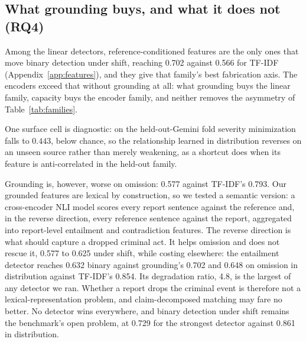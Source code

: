 \documentclass{article}
\begin{document}
\subsection{What grounding buys, and what it does not (RQ4)}
\label{sec:grounding}

Among the linear detectors, reference-conditioned features are the only ones
that move binary detection under shift, reaching 0.702 against 0.566 for TF-IDF
(Appendix~\ref{app:features}), and they give that family's best fabrication axis.
The encoders exceed that without grounding at all: what grounding buys
the linear family, capacity buys the encoder family, and neither removes the
asymmetry of Table~\ref{tab:families}.

One surface cell is diagnostic: on the held-out-Gemini fold severity
minimization falls to $0.443$, below chance, so the relationship learned in distribution reverses on an unseen source
rather than merely weakening, as a shortcut does when its feature is
anti-correlated in the held-out family.

Grounding is, however, worse on omission: 0.577 against TF-IDF's 0.793. Our
grounded features are lexical by construction, so we tested a semantic version: a cross-encoder NLI model scores every report sentence against the
reference and, in the reverse direction, every reference sentence against the
report, aggregated into report-level entailment and contradiction features. The
reverse direction is what should capture a dropped criminal act. It helps
omission and does not rescue it, 0.577 to 0.625 under shift, while costing
elsewhere: the entailment detector reaches 0.632 binary against grounding's
0.702 and 0.648 on omission in distribution against TF-IDF's 0.854. Its
degradation ratio, 4.8, is the largest of any detector we ran. Whether a report
drops the criminal event is therefore not a lexical-representation problem, and
claim-decomposed matching \citep{min2023factscore} may fare no better. No detector wins everywhere, and binary detection under shift
remains the benchmark's open problem, at 0.729 for the strongest detector
against 0.861 in distribution.
\end{document}
